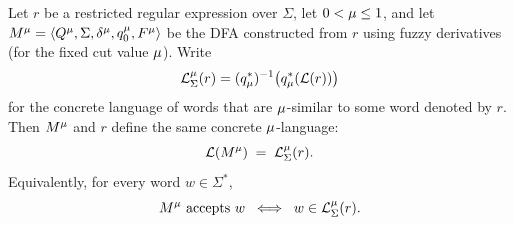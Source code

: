 \begin{theorem}\label{the:fuzzy-dfa-correctness}
Let $r$ be a restricted regular expression over $\Sigma$, let $0 < \mu \le 1$, and let
$M^\mu = \langle Q^\mu, \Sigma, \delta^\mu, q_0^\mu, F^\mu \rangle$
be the DFA constructed from $r$ using fuzzy derivatives (for the fixed cut
value $\mu$).
Write
\[
  \mathcal L^\mu_\Sigma(r)
  =
  (q_\mu^*)^{-1}\bigl(q_\mu^*(\mathcal L(r))\bigr)
\]
for the concrete language of words that are $\mu$-similar to some word denoted
by $r$. Then $M^\mu$ and $r$ define the same concrete $\mu$-language:
\[
  \mathcal{L}(M^\mu) \;=\; \mathcal{L}^\mu_\Sigma(r).
\]
Equivalently, for every word $w \in \Sigma^*$,
\[
  M^\mu \text{ accepts } w
  \;\;\Longleftrightarrow\;\;
  w \in \mathcal{L}^\mu_\Sigma(r).
\]
\end{theorem}

